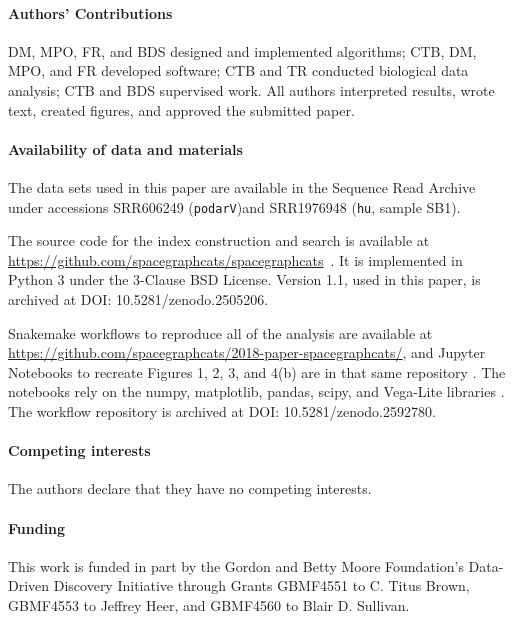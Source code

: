 \documentclass[9pt,twocolumn,twoside,lineno]{pnas-new}
\theoremstyle{case}
\numberwithin{subcase}{case}
\begin{document}
\showacknow %

\paragraph{Authors’ Contributions}

DM, MPO, FR, and BDS designed and implemented algorithms; CTB, DM,
MPO, and FR developed software; CTB and TR conducted biological data
analysis; CTB and BDS supervised work. All authors interpreted
results, wrote text, created figures, and approved the submitted
paper.

\paragraph{Availability of data and materials}

The data sets used in this paper are available in the Sequence Read
Archive under accessions SRR606249 (\texttt{podarV})and SRR1976948
(\texttt{hu}, sample SB1).

The source code for the index construction and search is available at
\url{https://github.com/spacegraphcats/spacegraphcats}~\cite{spacegraphcats}.
It is implemented in Python 3 under the 3-Clause BSD License. Version 1.1, used in this paper, is archived at DOI: 10.5281/zenodo.2505206.

Snakemake \cite{snakemake} workflows to reproduce all of the analysis
are available at
\url{https://github.com/spacegraphcats/2018-paper-spacegraphcats/},
and Jupyter Notebooks to recreate Figures 1, 2, 3, and 4(b) are in
that same repository \cite{jupyter}. The notebooks rely on the numpy,
matplotlib, pandas, scipy, and Vega-Lite libraries
\cite{numpy,matplotlib,pandas,scipy,vegalite}. The workflow repository
is archived at DOI: 10.5281/zenodo.2592780.

\paragraph{Competing interests}

The authors declare that they have no competing interests.

\paragraph{Funding}

This work is funded in part by the Gordon and Betty Moore Foundation’s
Data-Driven Discovery Initiative through Grants GBMF4551 to C. Titus
Brown, GBMF4553 to Jeffrey Heer, and GBMF4560 to Blair D. Sullivan.
\end{document}
